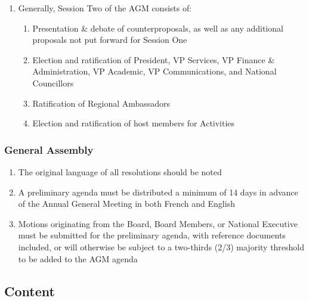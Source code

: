 \begin{enumerate}
 \item
  Generally, Session Two of the AGM consists of:

  \begin{enumerate}
   \item
    Presentation \& debate of counterproposals, as well as any additional proposals not put forward for Session One
   \item
    Election and ratification of President, VP Services, VP Finance \& Administration, VP Academic, VP Communications, and National Councillors
   \item
    Ratification of Regional Ambassadors
   \item
    Election and ratification of host members for Activities
  \end{enumerate}
\end{enumerate}

\subsubsection{General Assembly}
\label{general-assembly}

\begin{enumerate}
 \item
  The original language of all resolutions should be noted
 \item
  A preliminary agenda must be distributed a minimum of 14 days in advance of the Annual General Meeting in both French and English
 \item
  Motions originating from the Board, Board Members, or National Executive must be submitted for the preliminary agenda, with reference documents included, or will otherwise be subject to a two-thirds (2/3) majority threshold to be added to the AGM agenda
\end{enumerate}

\subsection{Content}
\label{content}

